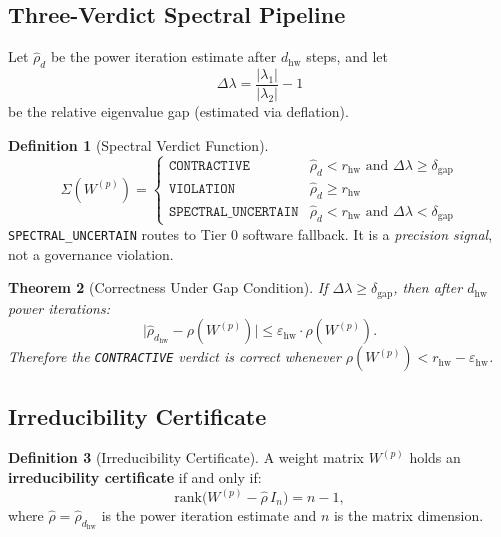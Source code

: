 \documentclass[12pt,letterpaper]{article}
\theoremstyle{plain}
\newtheorem{theorem}{Theorem}[section]
\theoremstyle{definition}
\newtheorem{definition}[theorem]{Definition}
\theoremstyle{remark}
\begin{document}
\subsection{Three-Verdict Spectral Pipeline}

Let \(\hat{\rho}_d\) be the power iteration estimate after \(d_{\mathrm{hw}}\)
steps, and let
\[
  \Delta\lambda = \frac{|\lambda_1|}{|\lambda_2|} - 1
\]
be the relative eigenvalue gap (estimated via deflation).

\begin{definition}[Spectral Verdict Function]
\begin{equation}
  \Sigma(W^{(p)}) = \begin{cases}
    \texttt{CONTRACTIVE}        & \hat{\rho}_d < r_{\mathrm{hw}} \text{ and } \Delta\lambda \geq \delta_{\mathrm{gap}} \\
    \texttt{VIOLATION}          & \hat{\rho}_d \geq r_{\mathrm{hw}} \\
    \texttt{SPECTRAL\_UNCERTAIN} & \hat{\rho}_d < r_{\mathrm{hw}} \text{ and } \Delta\lambda < \delta_{\mathrm{gap}}
  \end{cases} \label{eq:verdicts}
\end{equation}
\texttt{SPECTRAL\_UNCERTAIN} routes to Tier 0 software fallback. It is a
\emph{precision signal}, not a governance violation.
\end{definition}

\begin{theorem}[Correctness Under Gap Condition]
If \(\Delta\lambda \geq \delta_{\mathrm{gap}}\), then after \(d_{\mathrm{hw}}\)
power iterations:
\[
  \bigl|\hat{\rho}_{d_{\mathrm{hw}}} - \rho(W^{(p)})\bigr|
  \leq \varepsilon_{\mathrm{hw}} \cdot \rho(W^{(p)}).
\]
Therefore the \texttt{CONTRACTIVE} verdict is correct whenever
\(\rho(W^{(p)}) < r_{\mathrm{hw}} - \varepsilon_{\mathrm{hw}}\).
\end{theorem}

\subsection{Irreducibility Certificate}

\begin{definition}[Irreducibility Certificate]
A weight matrix \(W^{(p)}\) holds an \textbf{irreducibility certificate} if and
only if:
\begin{equation}
  \mathrm{rank}\bigl(W^{(p)} - \hat{\rho}\, I_n\bigr) = n - 1, \label{eq:irred}
\end{equation}
where \(\hat{\rho} = \hat{\rho}_{d_{\mathrm{hw}}}\) is the power iteration
estimate and \(n\) is the matrix dimension.
\end{definition}
\end{document}
